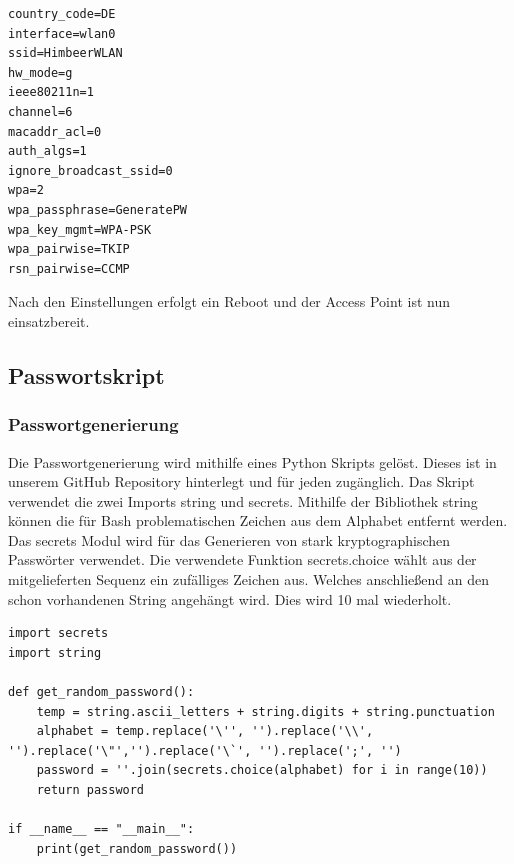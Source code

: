 \documentclass[a4paper,11pt,singlespacing]{article}
\begin{document}
                
                    \begin{lstlisting}
country_code=DE
interface=wlan0
ssid=HimbeerWLAN
hw_mode=g
ieee80211n=1
channel=6
macaddr_acl=0
auth_algs=1
ignore_broadcast_ssid=0
wpa=2
wpa_passphrase=GeneratePW
wpa_key_mgmt=WPA-PSK
wpa_pairwise=TKIP
rsn_pairwise=CCMP
                    \end{lstlisting} 
                   
                   Nach den Einstellungen erfolgt ein Reboot und der Access Point ist nun einsatzbereit.
                
     \subsection{Passwortskript}           
            
    	\subsubsection{Passwortgenerierung}
    		Die Passwortgenerierung wird mithilfe eines Python Skripts gelöst. Dieses ist in unserem GitHub Repository hinterlegt und für jeden zugänglich. Das Skript verwendet die zwei Imports string und secrets. Mithilfe der Bibliothek string können die für Bash problematischen Zeichen aus dem Alphabet entfernt werden. Das secrets Modul wird für das Generieren von stark kryptographischen Passwörter verwendet. Die verwendete Funktion secrets.choice wählt aus der mitgelieferten Sequenz ein zufälliges Zeichen aus. Welches anschließend an den schon vorhandenen String angehängt wird. Dies wird 10 mal wiederholt.
    	
    	

            \begin{lstlisting}
import secrets
import string

def get_random_password():
	temp = string.ascii_letters + string.digits + string.punctuation
	alphabet = temp.replace('\'', '').replace('\\', '').replace('\"','').replace('\`', '').replace(';', '')
	password = ''.join(secrets.choice(alphabet) for i in range(10))
	return password

if __name__ == "__main__":
	print(get_random_password())
            \end{lstlisting}
    	
\end{document}
